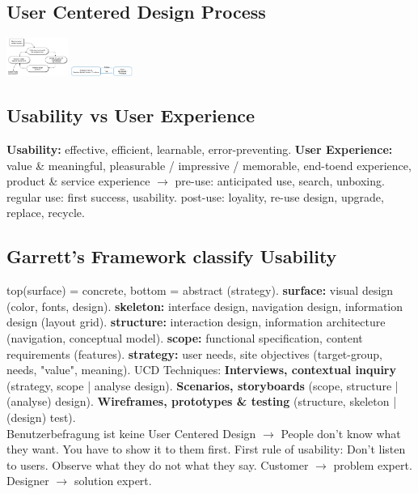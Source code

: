 \subsection{User Centered Design Process}
\includegraphics[width=0.15\textwidth]{user_centered_design_process.png}
\includegraphics[width=0.15\textwidth]{ucd_process.png}

\subsection{Usability vs User Experience}
\textbf{Usability:} effective, efficient, learnable, error-preventing.
\textbf{User Experience:} value \& meaningful, pleasurable / impressive / memorable, end-toend experience, product \& service experience $\rightarrow$ pre-use: anticipated use, search, unboxing. regular use: first success, usability. post-use: loyality, re-use design, upgrade, replace, recycle. 

\subsection{Garrett's Framework classify Usability}
top(surface) = concrete, bottom = abstract (strategy).
\textbf{surface:} visual design (color, fonts, design). \textbf{skeleton:} interface design, navigation design, information design (layout grid). \textbf{structure:} interaction design, information architecture (navigation, conceptual model). \textbf{scope:} functional specification, content requirements (features).
\textbf{strategy:} user needs, site objectives (target-group, needs, "value", meaning).
UCD Techniques: \textbf{Interviews, contextual inquiry} (strategy, scope | analyse design). \textbf{Scenarios, storyboards} (scope, structure | (analyse) design). \textbf{Wireframes, prototypes \& testing} (structure, skeleton | (design) test).
\\ Benutzerbefragung ist keine User Centered Design $\rightarrow$ People don't know what they want. You have to show it to them first. First rule of usability: Don't listen to users. Observe what they do not what they say. Customer $\rightarrow$ problem expert. Designer $\rightarrow$ solution expert.


